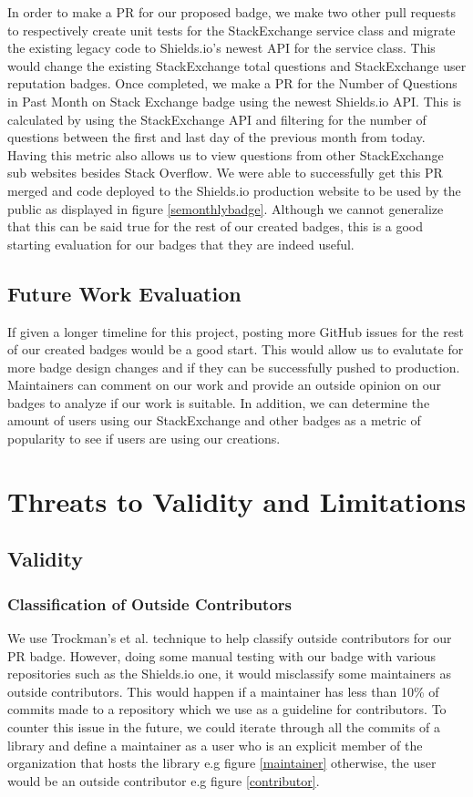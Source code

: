 \documentclass[12pt, letterpaper]{article}
\begin{document}
In order to make a PR for our proposed badge, we make two other pull requests to respectively
create unit tests for the StackExchange service class and migrate the existing legacy code to Shields.io's newest
API for the service class. This would change the existing StackExchange total questions and StackExchange
user reputation badges. Once completed, we make a PR for the Number of Questions in Past Month on Stack Exchange
badge using the newest Shields.io API. This is calculated by using the StackExchange API and filtering for the 
number of questions between the first and last day of the previous month from today. Having this metric also
allows us to view questions from other StackExchange sub websites besides Stack Overflow.
We were able to successfully get this PR merged and code deployed to the Shields.io \cite{shields} 
production website to be used by the public as displayed in figure \ref{semonthlybadge}. Although we cannot generalize that this can be said
true for the rest of our created badges, this is a good starting evaluation for our badges
that they are indeed useful. 

\subsection{Future Work Evaluation}
If given a longer timeline for this project, posting more GitHub issues for the rest of
our created badges would be a good start. This would allow us to evalutate for more badge design changes
and if they can be successfully pushed to production. Maintainers can comment on our work
and provide an outside opinion on our badges to analyze if our work is suitable. 
In addition, we can determine the amount of users using our StackExchange and other badges as
a metric of popularity to see if users are using our creations. 

\section{Threats to Validity and Limitations}

\subsection{Validity}
\subsubsection{Classification of Outside Contributors}
We use Trockman's et al. \cite{githubbadges} technique to help classify outside contributors for our PR badge.
However, doing some manual testing with our badge with various repositories such
as the Shields.io \cite{shieldsrepo} one, it would misclassify some maintainers as outside contributors.
This would happen if a maintainer has less than 10\% of commits made to a repository which we use as a guideline
for contributors.
To counter this issue in the future, we could iterate through all the commits of a library and define a maintainer as a user who is an explicit 
member of the organization that hosts
the library e.g figure \ref{maintainer} otherwise, the user would be an outside contributor e.g figure \ref{contributor}. 
\end{document}
